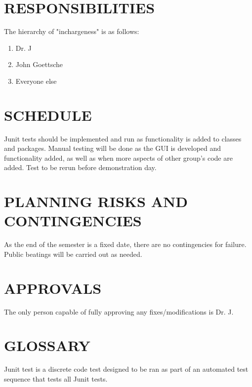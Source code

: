 {\section[RESPONSIBILITIES]{\bfseries\color{black} RESPONSIBILITIES}
{\color{black}
The hierarchy of "inchargeness" is as follows:
\begin{enumerate}
\item Dr. J
\item John Goettsche
\item Everyone else
\end{enumerate}
}
\section[SCHEDULE]{\bfseries\color{black} SCHEDULE}
{\color{black}
Junit tests should be implemented and run as functionality is added to classes and packages. Manual testing will be done as the GUI is developed and functionality added, as well as when more aspects of other group's code are added. Test to be rerun before demonstration day.
}

\section[PLANNING RISKS AND CONTINGENCIES]{\bfseries\color{black}
	 PLANNING RISKS AND CONTINGENCIES}
{\color{black}
As the end of the semester is a fixed date, there are no contingencies for failure. Public beatings will be carried out as needed.}

\section[APPROVALS]{\bfseries\color{black} APPROVALS}
{\color{black}
The only person capable of fully approving any fixes/modifications is Dr. J.}

\section[GLOSSARY]{\bfseries\color{black} GLOSSARY}
{\color{black}
Junit test is a discrete code test designed to be ran as part of an automated test sequence that tests all Junit tests.}



\clearpage\setcounter{page}{1}\pagestyle{Convertviii}

}
